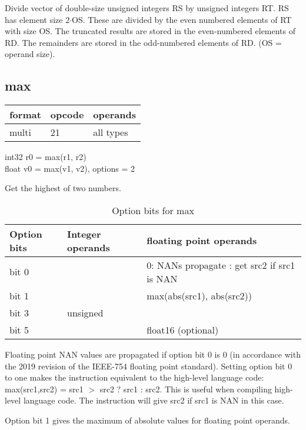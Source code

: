 \documentclass[forwardcom.tex]{subfiles}
\begin{document}
Divide vector of double-size unsigned integers RS by unsigned integers RT. RS has element size 2$\cdot$OS. These are divided by the even numbered elements of RT with size OS. The truncated results are stored in the even-numbered elements of RD. The remainders are stored in the odd-numbered elements of RD.
(OS = operand size).
\vv


\subsection{max}
\label{table:maxInstruction}
\begin{tabular}{|p{12mm}|p{15mm}|p{100mm}|}
\hline
\bfseries format & \bfseries opcode & \bfseries operands \\ \hline
multi & 21 & all types \\ \hline
\end{tabular}
\vv

int32 r0 = max(r1, r2) \\
float v0 = max(v1, v2), options = 2
\vv

Get the highest of two numbers.
\vv

\begin{longtable} {|p{16mm}|p{50mm}|p{50mm}|}
\caption{Option bits for max} 
\endfirsthead
\endhead
\hline
\bfseries Option bits & \bfseries Integer operands & \bfseries floating point operands   \\
\hline
bit 0 &  & 0: NANs propagate \newline 1: get src2 if src1 is NAN \\
\hline
bit 1 &  & max(abs(src1), abs(src2)) \\
\hline
bit 3 & unsigned &  \\
\hline
bit 5 &  & float16 (optional) \\
\hline
\end{longtable}


Floating point NAN values are propagated if option bit 0 is 0 (in accordance with the 2019 revision of the IEEE-754 floating point standard). 
Setting option bit 0 to one makes the instruction equivalent to the high-level language code:  max(src1,src2) = src1 $>$ src2 ? src1 : src2. This is useful when compiling high-level language code. The instruction will give src2 if src1 is NAN in this case. 
\vv

Option bit 1 gives the maximum of absolute values for floating point operands.
\vv
\end{document}
